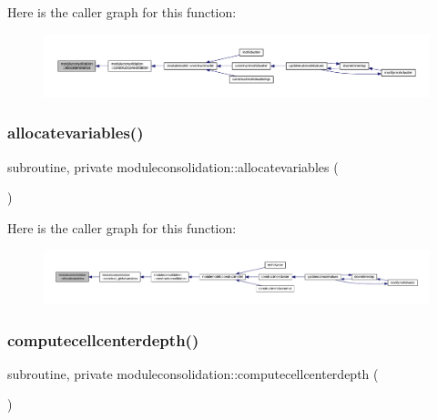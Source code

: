 Here is the caller graph for this function\+:\nopagebreak
\begin{figure}[H]
\begin{center}
\leavevmode
\includegraphics[width=350pt]{namespacemoduleconsolidation_ab891ed95a8328cd00b80d32b5bbc6bb6_icgraph}
\end{center}
\end{figure}
\mbox{\label{namespacemoduleconsolidation_a8bde788846d06954ea13eb84223da96a}} 
\subsubsection{\texorpdfstring{allocatevariables()}{allocatevariables()}}
{\footnotesize\ttfamily subroutine, private moduleconsolidation\+::allocatevariables (\begin{DoxyParamCaption}{ }\end{DoxyParamCaption})\hspace{0.3cm}{\ttfamily [private]}}

Here is the caller graph for this function\+:\nopagebreak
\begin{figure}[H]
\begin{center}
\leavevmode
\includegraphics[width=350pt]{namespacemoduleconsolidation_a8bde788846d06954ea13eb84223da96a_icgraph}
\end{center}
\end{figure}
\mbox{\label{namespacemoduleconsolidation_a3620cbc84f4868b17ace877ad56c903e}} 
\subsubsection{\texorpdfstring{computecellcenterdepth()}{computecellcenterdepth()}}
{\footnotesize\ttfamily subroutine, private moduleconsolidation\+::computecellcenterdepth (\begin{DoxyParamCaption}{ }\end{DoxyParamCaption})\hspace{0.3cm}{\ttfamily [private]}}


